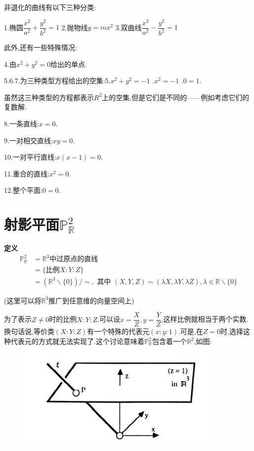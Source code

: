 \documentclass[UTF8]{book}
\begin{document}
	
		非退化的曲线有以下三种分类:
	
	
		1.椭圆$\dfrac{x^{2}}{a^{2}}+\dfrac{y^{2}}{b^{2}}=1$\indent
		2.抛物线$y=mx^{2}$\indent
		3.双曲线$\dfrac{x^{2}}{a^{2}}-\dfrac{y^{2}}{b^{2}}=1$
	
	
		此外,还有一些特殊情况:
	
	
		4.由$x^{2}+y^{2}=0$给出的单点.
	
	
		5.6.7.为三种类型方程给出的空集:5.$x^{2}+y^{2}=-1$ .$x^{2}=-1$ .$ 0=1 $.
		
		
		虽然这三种类型的方程都表示$R^{2}$上的空集,但是它们是不同的——例如考虑它们的复数解.
		
		
		8.一条直线:$ x=0 $.
		
		
		9.一对相交直线:$ xy=0 $.
		
		
		10.一对平行直线:$ x(x-1)=0 $.
		
		
		11.重合的直线:$x^{2}=0$.
		
		
		12.整个平面:$ 0=0 $.
	
	
	\section{射影平面$\mathbb{P}^{2}_{\mathbb{R}}$}
		\textbf{定义}
		\begin{equation*}
		\begin{aligned} \mathbb{P}^{2}_{\mathbb{R}}&= \mathbb{R}^{3} \text {中过原点的直线} \\ &=\{\text {比例} X : Y : Z\} \\ &=\left(\mathbb{R}^{3} \backslash\{0\}\right)/ \sim, \text { 其中 }(X, Y, Z) \sim(\lambda X, \lambda Y, \lambda Z), \lambda \in \mathbb{R} \backslash\{0\} \end{aligned}
		\end{equation*}
	
		(这里可以将$\mathbb{R}^{3}$推广到任意维的向量空间上)
	
	
	 	为了表示$ Z\neq0 $时的比例$ X:Y:Z $,可以设$x=\dfrac{X}{Z},y=\dfrac{Y}{Z}$,这样比例就相当于两个实数.换句话说,等价类$ (X:Y:Z) $有一个特殊的代表元$ (x:y:1) $.可是,在$ Z=0 $时,选择这种代表元的方式就无法实现了.这个讨论意味着$\mathbb{P}^{2}_{\mathbb{R}}$包含着一个$\mathbb{R}^{2}$,如图:
		\begin{figure}[H]
		  \centering
		  \includegraphics[width=10cm]{12.jpg}
		\end{figure}
	
\end{document}

